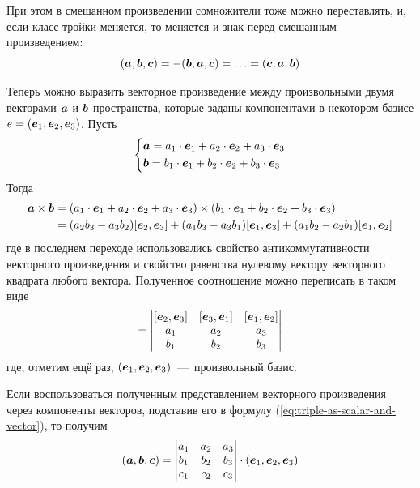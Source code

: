 \documentclass[a4paper,12pt]{article}
\begin{document}
  При этом в смешанном произведении сомножители тоже можно переставлять, и, если класс тройки меняется, то меняется и знак перед смешанным произведением:
  \begin{equation}\label{eq:triple-change-order}
    (\boldsymbol a, \boldsymbol b, \boldsymbol c) = -(\boldsymbol b, \boldsymbol a, \boldsymbol c) = \ldots = (\boldsymbol c, \boldsymbol a, \boldsymbol b)
  \end{equation}
  
  Теперь можно выразить векторное произведение между произвольными двумя векторами $\boldsymbol a$ и $\boldsymbol b$ пространства, которые заданы компонентами в некотором базисе $e \hm= (\bds e_1, \bds e_2, \bds e_3)$.
  Пусть
  \[
    \left\{
      \begin{aligned}
        &\boldsymbol a = a_1 \cdot \boldsymbol e_1 + a_2 \cdot \boldsymbol e_2 + a_3 \cdot \boldsymbol e_3\\
        &\boldsymbol b = b_1 \cdot \boldsymbol e_1 + b_2 \cdot \boldsymbol e_2 + b_3 \cdot \boldsymbol e_3
      \end{aligned}
    \right.
  \]
  Тогда
  \begin{equation*}
  \begin{split}
    \boldsymbol a \times \boldsymbol b
    =\; &(a_1 \cdot \boldsymbol e_1 + a_2 \cdot \boldsymbol e_2 + a_3 \cdot \boldsymbol e_3) \times (b_1 \cdot \boldsymbol e_1 + b_2 \cdot \boldsymbol e_2 + b_3 \cdot \boldsymbol e_3)\\
    =\; &(a_2 b_3 - a_3 b_2)[\boldsymbol e_2, \boldsymbol e_3] + (a_1 b_3 - a_3 b_1)[\boldsymbol e_1, \boldsymbol e_3] + (a_1 b_2 - a_2 b_1)[\boldsymbol e_1, \boldsymbol e_2]
  \end{split}
  \end{equation*}
  где в последнем переходе использовались свойство антикоммутативности векторного произведения и свойство равенства нулевому вектору векторного квадрата любого вектора.
  Полученное соотношение можно переписать в таком виде
  \begin{equation}
    [\bds a, \bds b] = \begin{vmatrix}
      [\bds e_2, \bds e_3] & [\bds e_3, \bds e_1] & [\bds e_1, \bds e_2]\\
      a_1 & a_2 & a_3\\
      b_1 & b_2 & b_3
    \end{vmatrix}
  \end{equation}
  где, отметим ещё раз, $(\boldsymbol e_1, \boldsymbol e_2, \boldsymbol e_3)$~---~произвольный базис.
  
  Если воспользоваться полученным представлением векторного произведения через компоненты векторов, подставив его в формулу (\ref{eq:triple-as-scalar-and-vector}), то получим
  \begin{equation}
    (\boldsymbol a, \boldsymbol b, \boldsymbol c) = \begin{vmatrix}
      a_1 & a_2 & a_3\\
      b_1 & b_2 & b_3\\
      c_1 & c_2 & c_3
    \end{vmatrix} \cdot (\boldsymbol e_1, \boldsymbol e_2, \boldsymbol e_3)
  \end{equation}
\end{document}
